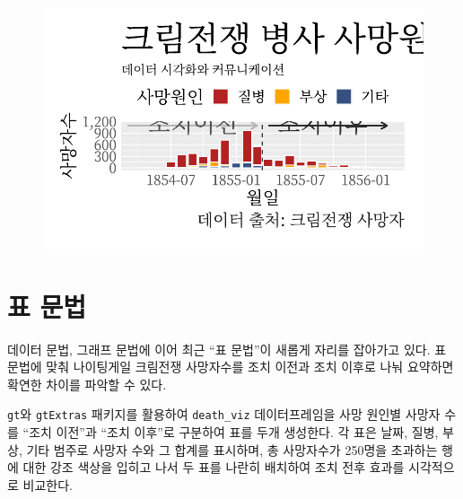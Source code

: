 \documentclass[
  letterpaper,
  chapter,a4paper,showtrims,openright,hidelinks]{oblivoir}
\begin{document}
\begin{figure}[H]

{\centering \includegraphics{cs_nightingale_files/figure-pdf/unnamed-chunk-6-1.pdf}

}

\end{figure}

\hypertarget{uxd45c-uxbb38uxbc95}{%
\section{표 문법}\label{uxd45c-uxbb38uxbc95}}

데이터 문법, 그래프 문법에 이어 최근 ``표 문법''이 새롭게 자리를
잡아가고 있다. 표 문법에 맞춰 나이팅게일 크림전쟁 사망자수를 조치 이전과
조치 이후로 나눠 요약하면 확연한 차이를 파악할 수 있다.

\texttt{gt}와 \texttt{gtExtras} 패키지를 활용하여 \texttt{death\_viz}
데이터프레임을 사망 원인별 사망자 수를 ``조치 이전''과 ``조치 이후''로
구분하여 표를 두개 생성한다. 각 표은 날짜, 질병, 부상, 기타 범주로
사망자 수와 그 합계를 표시하며, 총 사망자수가 250명을 초과하는 행에 대한
강조 색상을 입히고 나서 두 표를 나란히 배치하여 조치 전후 효과를
시각적으로 비교한다.
\end{document}
